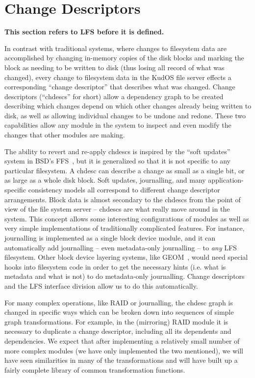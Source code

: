 \preparagraphspacing{}
\section*{Change Descriptors}
\label{sec:chdescs}

{\bf This section refers to LFS before it is defined.}

In contrast with traditional systems, where changes to filesystem data are
accomplished by changing in-memory copies of the disk blocks and marking the
block as needing to be written to disk (thus losing all record of what was
changed), every change to filesystem data in the KudOS file server effects a
corresponding ``change descriptor'' that describes what was changed. Change
descriptors (``chdescs'' for short) allow a dependency graph to be created
describing which changes depend on which other changes already being written to
disk, as well as allowing individual changes to be undone and redone. These two
capabilities allow any module in the system to inspect and even modify the
changes that other modules are making.

The ability to revert and re-apply chdescs is inspired by the ``soft updates''
system in BSD's FFS~\cite{ganger00soft}, but it is generalized so that it is not
specific to any particular filesystem. A chdesc can describe a change as small
as a single bit, or as large as a whole disk block. Soft updates, journalling,
and many application-specific consistency models all correspond to different
change descriptor arrangements. Block data is almost secondary to the chdescs
from the point of view of the file system server -- chdescs are what really move
around in the system. This concept allows some interesting configurations of
modules as well as very simple implementations of traditionally complicated
features. For instance, journalling is implemented as a single block device
module, and it can automatically add journalling -- even metadata-only
journalling -- to {\it any} LFS filesystem. Other block device layering systems,
like GEOM~\cite{geom}, would need special hooks into filesystem code in order to
get the necessary hints (i.e. what is metadata and what is not) to do
metadata-only journalling. Change descriptors and the LFS interface division
allow us to do this automatically.

For many complex operations, like RAID or journalling, the chdesc graph is
changed in specific ways which can be broken down into sequences of simple graph
transformations. For example, in the (mirroring) RAID module it is necessary to
duplicate a change descriptor, including all its dependents and dependencies. We
expect that after implementing a relatively small number of more complex modules
(we have only implemented the two mentioned), we will have seen similarities in
many of the transformations and will have built up a fairly complete library of
common transformation functions.

